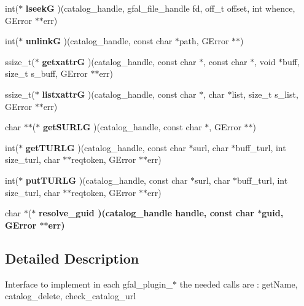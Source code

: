 \begin{CompactItemize}
\item 
int($\ast$ \textbf{lseek\-G} )(catalog\_\-handle, gfal\_\-file\_\-handle fd, off\_\-t offset, int whence, GError $\ast$$\ast$err)\label{struct__gfal__catalog__interface_7f66631bd2d7919666ea9383e55c5837}

\item 
int($\ast$ \textbf{unlink\-G} )(catalog\_\-handle, const char $\ast$path, GError $\ast$$\ast$)\label{struct__gfal__catalog__interface_1fc0c9cbd8821484dc6d2532ebdc2b28}

\item 
ssize\_\-t($\ast$ \textbf{getxattr\-G} )(catalog\_\-handle, const char $\ast$, const char $\ast$, void $\ast$buff, size\_\-t s\_\-buff, GError $\ast$$\ast$err)\label{struct__gfal__catalog__interface_8d6974ac822e7360db9ec11f88aa787d}

\item 
ssize\_\-t($\ast$ \textbf{listxattr\-G} )(catalog\_\-handle, const char $\ast$, char $\ast$list, size\_\-t s\_\-list, GError $\ast$$\ast$err)\label{struct__gfal__catalog__interface_33b6ee495d6dbdf44097eab70094953f}

\item 
char $\ast$$\ast$($\ast$ \textbf{get\-SURLG} )(catalog\_\-handle, const char $\ast$, GError $\ast$$\ast$)\label{struct__gfal__catalog__interface_8a79a58a74fb3f7e4da85247d60d0323}

\item 
int($\ast$ \textbf{get\-TURLG} )(catalog\_\-handle, const char $\ast$surl, char $\ast$buff\_\-turl, int size\_\-turl, char $\ast$$\ast$reqtoken, GError $\ast$$\ast$err)\label{struct__gfal__catalog__interface_f2664982e4ee83af2145ea7e190f1169}

\item 
int($\ast$ \textbf{put\-TURLG} )(catalog\_\-handle, const char $\ast$surl, char $\ast$buff\_\-turl, int size\_\-turl, char $\ast$$\ast$reqtoken, GError $\ast$$\ast$err)\label{struct__gfal__catalog__interface_19227139e261ebb890bff5d22c20322a}

\item 
char $\ast$($\ast$ \bf{resolve\_\-guid} )(catalog\_\-handle handle, const char $\ast$guid, GError $\ast$$\ast$err)
\end{CompactItemize}


\subsection{Detailed Description}
Interface to implement in each gfal\_\-plugin\_\-$\ast$ the needed calls are : get\-Name, catalog\_\-delete, check\_\-catalog\_\-url 



